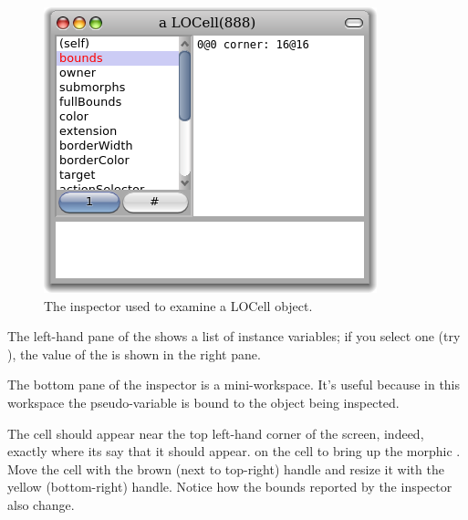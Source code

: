 \documentclass[a4paper,10pt,twoside]{book}
\begin{document}
\begin{figure}[htbp]
   \centering
   \includegraphics[scale=0.5]{LOCellInspector} 
   \caption{The inspector used to examine a LOCell object.\label{fig:LOCellInspector}}
\end{figure}

The left-hand pane of the  shows a list of instance variables; if you select one (try \mbox{),} the value of the  is shown in the right pane.


The bottom pane of the inspector is a mini-workspace.  It's useful because in this workspace the pseudo-variable \self is bound to the object being inspected. 

The cell should appear near the top left-hand corner of the screen, indeed, exactly where its  say that it should appear.
\metaclick on the cell to bring up the morphic .
Move the cell with the brown (next to top-right) handle and resize it with the yellow (bottom-right) handle.
Notice how the bounds reported by the inspector also change.
\end{document}
